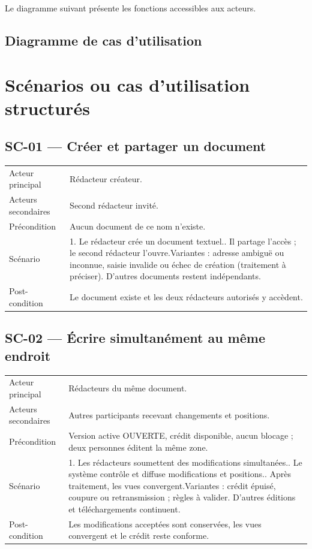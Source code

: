 Le diagramme suivant présente les fonctions accessibles aux acteurs.
\subsection{Diagramme de cas d'utilisation}

\section{Scénarios ou cas d'utilisation structurés}
\subsection{SC-01 --- Créer et partager un document}
\begin{longtable}{@{}L{30mm}L{126mm}@{}}
\toprule
Acteur principal & Rédacteur créateur.\\
Acteurs secondaires & Second rédacteur invité.\\
Précondition & Aucun document de ce nom n’existe.\\
Scénario & 1. Le rédacteur crée un document textuel.. Il partage l’accès ; le second rédacteur l’ouvre.\newline Variantes : adresse ambiguë ou inconnue, saisie invalide ou échec de création (traitement à préciser). D’autres documents restent indépendants.\\
Post-condition & Le document existe et les deux rédacteurs autorisés y accèdent.\\
\bottomrule
\end{longtable}
\subsection{SC-02 --- Écrire simultanément au même endroit}
\begin{longtable}{@{}L{30mm}L{126mm}@{}}
\toprule
Acteur principal & Rédacteurs du même document.\\
Acteurs secondaires & Autres participants recevant changements et positions.\\
Précondition & Version active OUVERTE, crédit disponible, aucun blocage ; deux personnes éditent la même zone.\\
Scénario & 1. Les rédacteurs soumettent des modifications simultanées.. Le système contrôle et diffuse modifications et positions.. Après traitement, les vues convergent.\newline Variantes : crédit épuisé, coupure ou retransmission ; règles à valider. D’autres éditions et téléchargements continuent.\\
Post-condition & Les modifications acceptées sont conservées, les vues convergent et le crédit reste conforme.\\
\bottomrule
\end{longtable}
